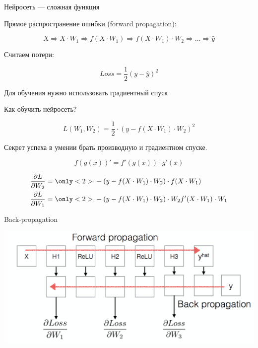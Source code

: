\documentclass[notes,12pt, aspectratio=169]{beamer}
\newenvironment{wideitemize}{\itemize\addtolength{\itemsep}{10pt}}{\enditemize}
\begin{document}
\begin{frame}{Нейросеть —  сложная функция}
\begin{wideitemize}
\item Прямое распространение ошибки (forward propagation): 

\[ X \Rightarrow X \cdot W_1 \Rightarrow f(X \cdot W_1) \Rightarrow f(X \cdot W_1) \cdot W_2 \Rightarrow \ldots \Rightarrow \hat{y} \]

\item Считаем потери:

\[Loss = \frac{1}{2} (y - \hat y)^2\]

\item Для обучения нужно использовать градиентный спуск
\end{wideitemize}
\end{frame}


\begin{frame}{Как обучить нейросеть?}

\[ L(W_1, W_2) =  \frac{1}{2} \cdot (y - f(X \cdot W_1) \cdot W_2)^2\]

Секрет успеха в умении брать производную и градиентном спуске.

\[f(g(x))' = f'(g(x)) \cdot g'(x) \]

\begin{equation*} 
\begin{aligned} 
\frac{\partial L}{\partial W_2} &=   { \only<2>{ \color{red}} - (y - f(X \cdot W_1) \cdot W_2) } \cdot f(X \cdot W_1) \\
\frac{\partial L}{\partial W_1} &= { \only<2>{ \color{red}}  - (y - f(X \cdot W_1) \cdot W_2) } \cdot W_2 f'(X \cdot W_1) \cdot W_1 
\end{aligned}
\end{equation*}

\vfill

\end{frame}


\begin{frame}{Back-propagation}
\begin{center}
\includegraphics[width=.8\linewidth]{backpropagation.png}
\end{center}
\end{frame}
\end{document}
